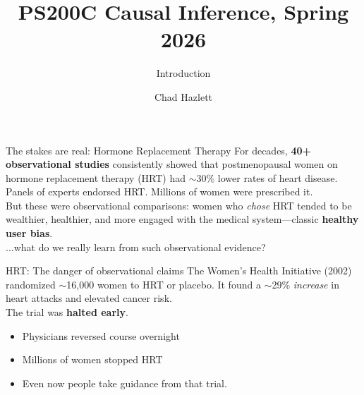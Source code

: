 \documentclass[xcolor=dvipsnames]{beamer}
\title[]{PS200C Causal Inference, Spring 2026}
\subtitle[ ]{Introduction}
\author[Hazlett]{Chad Hazlett }
\institute[UCLA]{UCLA\\[1ex]
  \texttt{chazlett@ucla.edu}
}
\date{}
\begin{document}
\subject{Talks}


\begin{frame}
  \titlepage
\end{frame}


\begin{frame}{The stakes are real: Hormone Replacement Therapy}
\small
{} For decades, \textbf{40+ observational studies} consistently showed that postmenopausal women on hormone replacement therapy (HRT) had $\sim$30\% lower rates of heart disease.\\
\bigskip
{} Panels of experts endorsed HRT. Millions of women were prescribed it.\\
\bigskip
{} But these were observational comparisons: women who \textit{chose} HRT tended to be wealthier, healthier, and more engaged with the medical system---classic \textbf{healthy user bias}.\\
\bigskip
{} ...what do we really learn from such observational evidence?
\end{frame}

\begin{frame}{HRT: The danger of observational claims}
 The Women's Health Initiative (2002) randomized $\sim$16,000 women to HRT or placebo. It found a $\sim$29\% \textit{increase} in heart attacks and elevated cancer risk.\\
\medskip
{} The trial was \textbf{halted early}. 
\begin{itemize}
\item Physicians reversed course overnight
\item  Millions of women stopped HRT
\item Even now people take guidance from that trial.
\end{itemize}
\end{frame}
\end{document}
